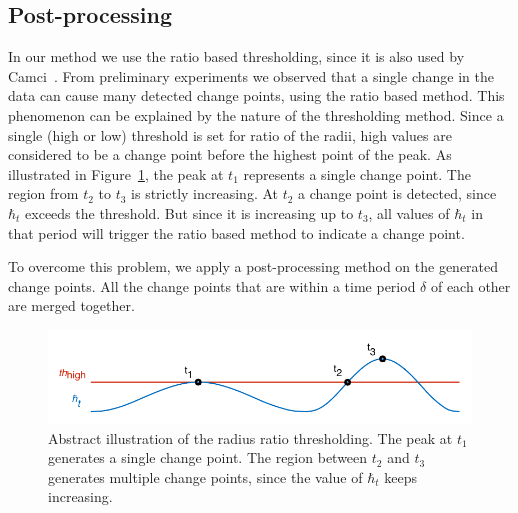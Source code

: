 \subsection{Post-processing}
In our method we use the ratio based thresholding, since it is also used by Camci~\cite{camci2010change}.
From preliminary experiments we observed that a single change in the data can cause many detected change points, using the ratio based method.
This phenomenon can be explained by the nature of the thresholding method.
Since a single (high or low) threshold is set for ratio of the radii, high values are considered to be a change point before the highest point of the peak.
As illustrated in Figure~\ref{fig:tresholding}, the peak at $t_1$ represents a single change point.
The region from $t_2$ to $t_3$ is strictly increasing.
At $t_2$ a change point is detected, since $\hbar_t$ exceeds the threshold.
But since it is increasing up to $t_3$, all values of $\hbar_t$ in that period will trigger the ratio based method to indicate a change point.

To overcome this problem, we apply a post-processing method on the generated change points.
All the change points that are within a time period $\delta$ of each other are merged together.

\begin{figure}
  \centering
    \includegraphics[width=\textwidth,height=\textheight,keepaspectratio]{./Figures/chapter4/signal_threshold.pdf}
  \caption[Thresholding]{Abstract illustration of the radius ratio thresholding. The peak at $t_1$ generates a single change point. The region between $t_2$ and $t_3$ generates multiple change points, since the value of $\hbar_t$ keeps increasing.}
  \label{fig:tresholding}
\end{figure}

